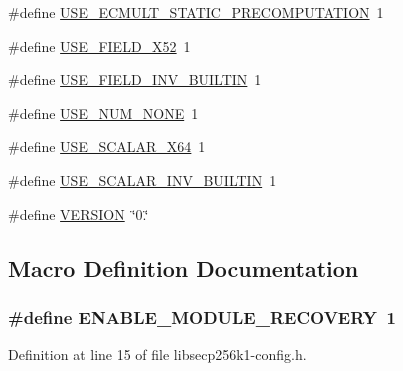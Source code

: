 \begin{DoxyCompactItemize}
\#define \hyperlink{libsecp256k1-config_8h_abf257cb25e3b35dfc3426b560ed893ee}{U\+S\+E\+\_\+\+E\+C\+M\+U\+L\+T\+\_\+\+S\+T\+A\+T\+I\+C\+\_\+\+P\+R\+E\+C\+O\+M\+P\+U\+T\+A\+T\+I\+O\+N}~1
\item 
\#define \hyperlink{libsecp256k1-config_8h_aea670563738e11fb5f67887e2379a7ac}{U\+S\+E\+\_\+\+F\+I\+E\+L\+D\+\_\+X52}~1
\item 
\#define \hyperlink{libsecp256k1-config_8h_a29d73892c2338d0d6464ed5c837e2246}{U\+S\+E\+\_\+\+F\+I\+E\+L\+D\+\_\+\+I\+N\+V\+\_\+\+B\+U\+I\+L\+T\+I\+N}~1
\item 
\#define \hyperlink{libsecp256k1-config_8h_a67432081c2c2e8893d944c7f3e220a83}{U\+S\+E\+\_\+\+N\+U\+M\+\_\+\+N\+O\+N\+E}~1
\item 
\#define \hyperlink{libsecp256k1-config_8h_a2f36ae8fc25b9a4e4e7369da3872579a}{U\+S\+E\+\_\+\+S\+C\+A\+L\+A\+R\+\_\+X64}~1
\item 
\#define \hyperlink{libsecp256k1-config_8h_a827be109fa765a29a66475a1d78bf6b4}{U\+S\+E\+\_\+\+S\+C\+A\+L\+A\+R\+\_\+\+I\+N\+V\+\_\+\+B\+U\+I\+L\+T\+I\+N}~1
\item 
\#define \hyperlink{libsecp256k1-config_8h_a1c6d5de492ac61ad29aec7aa9a436bbf}{V\+E\+R\+S\+I\+O\+N}~\char`\"{}0.\char`\"{}
\end{DoxyCompactItemize}


\subsection{Macro Definition Documentation}
\hypertarget{libsecp256k1-config_8h_aabee9d96497d59be9118603daa72938c}{}
\subsubsection[{E\+N\+A\+B\+L\+E\+\_\+\+M\+O\+D\+U\+L\+E\+\_\+\+R\+E\+C\+O\+V\+E\+R\+Y}]{\setlength{\rightskip}{0pt plus 5cm}\#define E\+N\+A\+B\+L\+E\+\_\+\+M\+O\+D\+U\+L\+E\+\_\+\+R\+E\+C\+O\+V\+E\+R\+Y~1}\label{libsecp256k1-config_8h_aabee9d96497d59be9118603daa72938c}


Definition at line 15 of file libsecp256k1-\/config.\+h.

